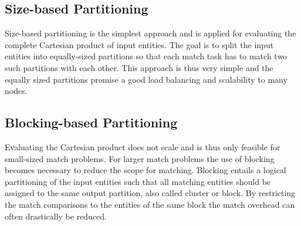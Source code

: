 \subsection{Size-based Partitioning}
Size-based partitioning is the simplest approach and is applied for evaluating the complete Cartesian product of input entities. The goal is to split the input entities into equally-sized partitions so that each match task has to match two such partitions with each other. This approach is thus very simple and the equally sized partitions promise a good load balancing and scalability to many nodes.

\subsection{Blocking-based Partitioning}
Evaluating the Cartesian product does not scale and is thus only feasible for small-sized match problems. For larger match problems the use of blocking becomes necessary to reduce the scope for matching. Blocking entails a logical partitioning of the input entities such that all matching entities should be assigned to the same output partition, also called cluster or block. By restricting the match comparisons to the entities of the same block the match overhead can often drastically be reduced.
